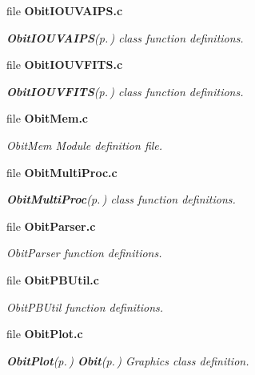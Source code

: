 \begin{CompactItemize}
\item 
file {\bf Obit\-IOUVAIPS.c}
\begin{CompactList}\small\item\em {\bf Obit\-IOUVAIPS}{\rm (p.\,\pageref{structObitIOUVAIPS})} class function definitions. \item\end{CompactList}

\item 
file {\bf Obit\-IOUVFITS.c}
\begin{CompactList}\small\item\em {\bf Obit\-IOUVFITS}{\rm (p.\,\pageref{structObitIOUVFITS})} class function definitions. \item\end{CompactList}

\item 
file {\bf Obit\-Mem.c}
\begin{CompactList}\small\item\em Obit\-Mem Module definition file. \item\end{CompactList}

\item 
file {\bf Obit\-Multi\-Proc.c}
\begin{CompactList}\small\item\em {\bf Obit\-Multi\-Proc}{\rm (p.\,\pageref{structObitMultiProc})} class function definitions. \item\end{CompactList}

\item 
file {\bf Obit\-Parser.c}
\begin{CompactList}\small\item\em Obit\-Parser function definitions. \item\end{CompactList}

\item 
file {\bf Obit\-PBUtil.c}
\begin{CompactList}\small\item\em Obit\-PBUtil function definitions. \item\end{CompactList}

\item 
file {\bf Obit\-Plot.c}
\begin{CompactList}\small\item\em {\bf Obit\-Plot}{\rm (p.\,\pageref{structObitPlot})} {\bf Obit}{\rm (p.\,\pageref{structObit})} Graphics class definition. \item\end{CompactList}


\end{CompactItemize}
